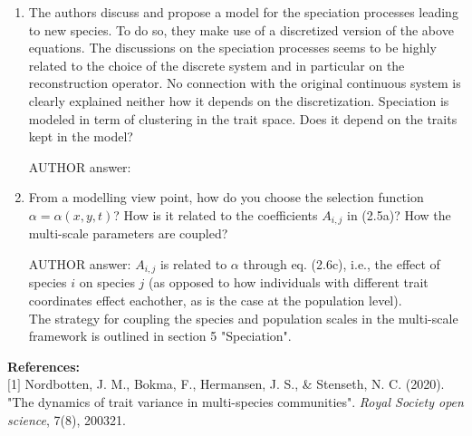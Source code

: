 \documentclass[a4paper,11pt]{scrartcl}
\begin{document}
\begin{enumerate}
\item
The authors discuss and propose a model for the speciation processes leading to new species. To do so, they make use of a discretized version of the above equations. The discussions on the speciation processes seems to be highly related to the choice of the discrete system and in particular on the reconstruction operator. No connection with the original continuous system is clearly explained neither how it depends on the discretization.
Speciation is modeled in term of clustering in the trait space. Does it depend on the traits kept in the model?

AUTHOR answer:

\item
From a modelling view point, how do you choose the selection function $\alpha=\alpha(x,y,t)$? How is it related to the coefficients $A_{i,j}$ in (2.5a)? How the multi-scale parameters are coupled?

AUTHOR answer: $A_{i,j}$ is related to $\alpha$ through eq. (2.6c), i.e., the effect of species $i$ on species $j$ (as opposed to how individuals with different trait coordinates effect eachother, as is the case at the population level). \\

The strategy for coupling the species and population scales in the multi-scale framework is outlined in section 5 "Speciation".
\end{enumerate}

\textbf{References:}\\

$[$1$]$ Nordbotten, J. M., Bokma, F., Hermansen, J. S., \& Stenseth, N. C. (2020). "The dynamics of trait variance in multi-species communities". \textit{Royal Society open science}, 7(8), 200321. 
\end{document}
